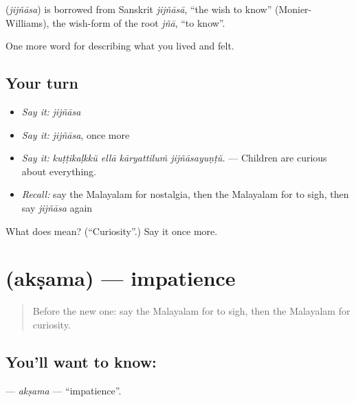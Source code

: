 \begin{cousinweb}
\textbf{} (\emph{jijñāsa}) is borrowed from Sanskrit \emph{jijñāsā}, \textquotedblleft{}the wish to know\textquotedblright{} (Monier-Williams), the wish-form of the root \emph{jñā}, \textquotedblleft{}to know\textquotedblright{}.
\end{cousinweb}

\begin{grammarlens}[title={What you've built}]
One more word for describing what you lived and felt.
\end{grammarlens}

\subsection*{Your turn}
\begin{itemize}
\raggedright
  \item \emph{Say it:} \emph{jijñāsa}
  \item \emph{Say it:} \emph{jijñāsa}, once more
  \item \emph{Say it:} \emph{kuṭṭikaḷkkŭ ellā kāryattiluṁ jijñāsayuṇṭŭ.} — Children are curious about everything.
  \item \emph{Recall:} say the Malayalam for nostalgia, then the Malayalam for to sigh, then say \emph{jijñāsa} again
\end{itemize}

\begin{tcolorbox}[breakable,colback=teal!4,colframe=teal!35!black,title={Before you move on}]
What does  mean? (\textquotedblleft{}Curiosity\textquotedblright{}.) Say it once more.
\end{tcolorbox}
\section[\texorpdfstring{\ml{അക്ഷമ} (akṣama)}{അക്ഷമ (akṣama)}]{ (akṣama) — impatience}

\label{lesson:ML-C522-aksama}



\begin{quote}
Before the new one: say the Malayalam for to sigh, then the Malayalam for curiosity.
\end{quote}

\subsection*{You'll want to know: }
\textbf{} — \emph{akṣama} — \textquotedblleft{}impatience\textquotedblright{}.

